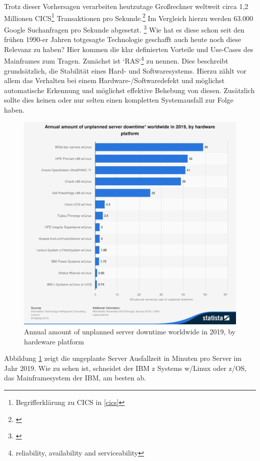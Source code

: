 Trotz dieser Vorhersagen verarbeiten heutzutage Großrechner weltweit circa 1,2 Millionen CICS\footnote{Begrifferklärung zu CICS in \ref{cics}} Transaktionen pro Sekunde.\footnote{\cite{IBM.2019}}
Im Vergleich hierzu werden 63.000 Google Suchanfragen pro Sekunde abgesetzt. \footnote{\cite{Sullivan.2016}}
Wie hat es diese schon seit den frühen 1990-er Jahren totgesagte Technologie geschafft auch heute noch diese Relevanz zu haben?
Hier kommen die klar definierten Vorteile und Use-Cases des Mainframes zum Tragen.
Zunächst ist `RAS`\footnote{reliability, availability and serviceability} zu nennen.
Dies beschreibt grundsätzlich, die Stabilität eines Hard- und Softwaresystems.
Hierzu zählt vor allem das Verhalten bei einem Hardware-/Softwaredefekt und möglichst automatische Erkennung und möglichst effektive Behebung von diesen.
Zusätzlich sollte dies keinen oder nur selten einen kompletten Systemausfall zur Folge haben.
\begin{figure}[h]
	\centering
	\includegraphics[width=\textwidth]{figures/statistic_id515285_unplanned-server-downtime-globally-2019-by-hardware-platform.png}
	\caption{Annual amount of unplanned server downtime worldwide in 2019, by hardeware platform}
	\label{fig:serverdowntime}
\end{figure}
Abbildung \ref{fig:serverdowntime} zeigt die ungeplante Server Ausfallzeit in Minuten pro Server im Jahr 2019.
Wie zu sehen ist, schneidet der IBM z Systems w/Linux oder z/OS, das Mainframesystem der IBM, am besten ab.


